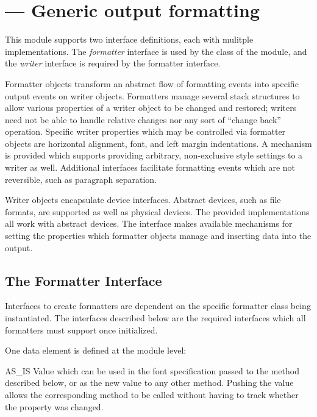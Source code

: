 \section{ ---
         Generic output formatting}




This module supports two interface definitions, each with mulitple
implementations.  The \emph{formatter} interface is used by the
 class of the  module, and the
\emph{writer} interface is required by the formatter interface.

Formatter objects transform an abstract flow of formatting events into
specific output events on writer objects.  Formatters manage several
stack structures to allow various properties of a writer object to be
changed and restored; writers need not be able to handle relative
changes nor any sort of ``change back'' operation.  Specific writer
properties which may be controlled via formatter objects are
horizontal alignment, font, and left margin indentations.  A mechanism
is provided which supports providing arbitrary, non-exclusive style
settings to a writer as well.  Additional interfaces facilitate
formatting events which are not reversible, such as paragraph
separation.

Writer objects encapsulate device interfaces.  Abstract devices, such
as file formats, are supported as well as physical devices.  The
provided implementations all work with abstract devices.  The
interface makes available mechanisms for setting the properties which
formatter objects manage and inserting data into the output.


\subsection{The Formatter Interface \label{formatter-interface}}

Interfaces to create formatters are dependent on the specific
formatter class being instantiated.  The interfaces described below
are the required interfaces which all formatters must support once
initialized.

One data element is defined at the module level:


\begin{datadesc}{AS_IS}
Value which can be used in the font specification passed to the
 method described below, or as the new value to any
other  method.  Pushing the 
value allows the corresponding  method to
be called without having to track whether the property was changed.
\end{datadesc}

